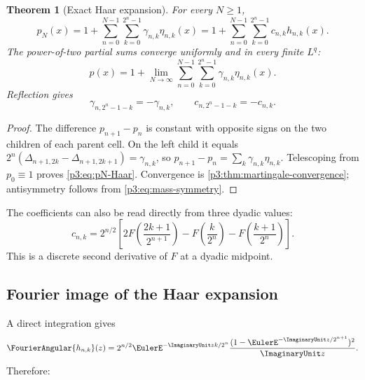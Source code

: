 \documentclass[11pt]{article}
\newtheorem{theorem}{Theorem}[section]
\theoremstyle{definition}
\theoremstyle{remark}
\begin{document}
\begin{theorem}[Exact Haar expansion]
\label{p3:thm:Haar-expansion}
For every $N\ge1$,
\begin{equation}\label{p3:eq:pN-Haar}
 p_N(x)=1+\sum_{n=0}^{N-1}\sum_{k=0}^{2^n-1}
 \gamma_{n,k}\eta_{n,k}(x)
 =1+\sum_{n=0}^{N-1}\sum_{k=0}^{2^n-1}
 c_{n,k}h_{n,k}(x).
\end{equation}
The power-of-two partial sums converge uniformly and in every finite $L^q$:
\begin{equation}\label{p3:eq:p-Haar-limit}
 p(x)=1+\lim_{N\to\infty}
 \sum_{n=0}^{N-1}\sum_{k=0}^{2^n-1}\gamma_{n,k}\eta_{n,k}(x).
\end{equation}
Reflection gives
\begin{equation}\label{p3:eq:Haar-antisymmetry}
 \gamma_{n,2^n-1-k}=-\gamma_{n,k},
 \qquad
 c_{n,2^n-1-k}=-c_{n,k}.
\end{equation}
\end{theorem}

\begin{proof}
The difference $p_{n+1}-p_n$ is constant with opposite signs on the two
children of each parent cell.  On the left child it equals
$2^n(\Delta_{n+1,2k}-\Delta_{n+1,2k+1})=\gamma_{n,k}$,
so $p_{n+1}-p_n=\sum_k\gamma_{n,k}\eta_{n,k}$.  Telescoping from
$p_0\equiv1$ proves \eqref{p3:eq:pN-Haar}.  Convergence is
\cref{p3:thm:martingale-convergence}; antisymmetry follows from
\eqref{p3:eq:mass-symmetry}.
\end{proof}

The coefficients can also be read directly from three dyadic values:
\begin{equation}\label{p3:eq:c-three-values}
 c_{n,k}=2^{n/2}\left[
  2F\!\left(\frac{2k+1}{2^{n+1}}\right)
  -F\!\left(\frac{k}{2^n}\right)
  -F\!\left(\frac{k+1}{2^n}\right)
 \right].
\end{equation}
This is a discrete second derivative of $F$ at a dyadic midpoint.

\subsection{Fourier image of the Haar expansion}

A direct integration gives
\begin{equation}\label{p3:eq:Haar-transform}
 \FourierAngular{h_{n,k}}(z)
 =2^{n/2}\EulerE^{-\ImaginaryUnit zk/2^n}
 \frac{(1-\EulerE^{-\ImaginaryUnit z/2^{n+1}})^2}{\ImaginaryUnit z}.
\end{equation}
Therefore:
\end{document}

